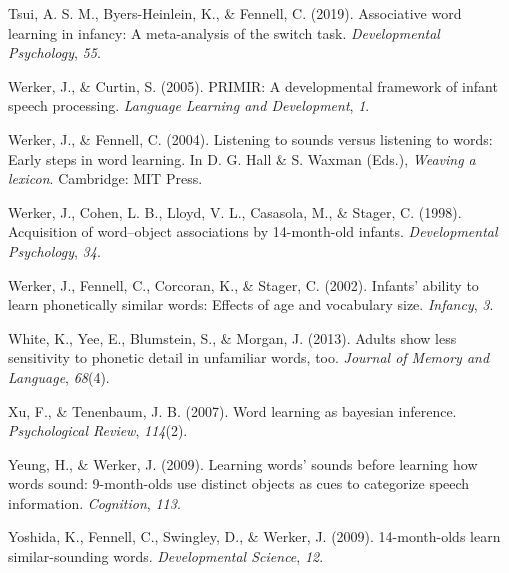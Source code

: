 \documentclass[english,,man]{apa6}
\theoremstyle{definition}
\theoremstyle{definition}
\theoremstyle{definition}
\theoremstyle{remark}
\begin{document}
\hypertarget{ref-tsui2019}{}
Tsui, A. S. M., Byers-Heinlein, K., \& Fennell, C. (2019). Associative
word learning in infancy: A meta-analysis of the switch task.
\emph{Developmental Psychology}, \emph{55}.

\hypertarget{ref-werker2005}{}
Werker, J., \& Curtin, S. (2005). PRIMIR: A developmental framework of
infant speech processing. \emph{Language Learning and Development},
\emph{1}.

\hypertarget{ref-werker2004}{}
Werker, J., \& Fennell, C. (2004). Listening to sounds versus listening
to words: Early steps in word learning. In D. G. Hall \& S. Waxman
(Eds.), \emph{Weaving a lexicon}. Cambridge: MIT Press.

\hypertarget{ref-werker1998}{}
Werker, J., Cohen, L. B., Lloyd, V. L., Casasola, M., \& Stager, C.
(1998). Acquisition of word--object associations by 14-month-old
infants. \emph{Developmental Psychology}, \emph{34}.

\hypertarget{ref-werker2002}{}
Werker, J., Fennell, C., Corcoran, K., \& Stager, C. (2002). Infants'
ability to learn phonetically similar words: Effects of age and
vocabulary size. \emph{Infancy}, \emph{3}.

\hypertarget{ref-white2013}{}
White, K., Yee, E., Blumstein, S., \& Morgan, J. (2013). Adults show
less sensitivity to phonetic detail in unfamiliar words, too.
\emph{Journal of Memory and Language}, \emph{68}(4).

\hypertarget{ref-xu2007}{}
Xu, F., \& Tenenbaum, J. B. (2007). Word learning as bayesian inference.
\emph{Psychological Review}, \emph{114}(2).

\hypertarget{ref-yeung09}{}
Yeung, H., \& Werker, J. (2009). Learning words' sounds before learning
how words sound: 9-month-olds use distinct objects as cues to categorize
speech information. \emph{Cognition}, \emph{113}.

\hypertarget{ref-yoshida2009}{}
Yoshida, K., Fennell, C., Swingley, D., \& Werker, J. (2009).
14-month-olds learn similar-sounding words. \emph{Developmental
Science}, \emph{12}.

\clearpage

\renewcommand{\listfigurename}{Figure captions}

\listoffigures
\end{document}
